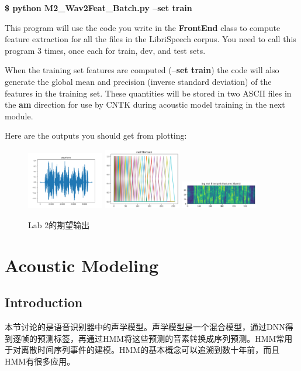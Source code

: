 {\bf \$ python M2\_Wav2Feat\_Batch.py –set train}

This program will use the code you write in the {\bf FrontEnd} class to compute feature extraction for all the files in the LibriSpeech corpus. You need to call this program 3 times, once each for train, dev, and test sets.

When the training set features are computed ({\bf –set train}) the code will also generate the global mean and precision (inverse standard deviation) of the features in the training set. These quantities will be stored in two ASCII files in the {\bf am} direction for use by CNTK during acoustic model training in the next module.

Here are the outputs you should get from plotting:
\begin{figure}[!ht]
	\centering
	\includegraphics[width=0.30\textwidth]{figure/lab2-1}
	\hspace{0.5cm}
	\includegraphics[width=0.30\textwidth]{figure/lab2-2}
	\hspace{0.5cm}
	\includegraphics[width=0.30\textwidth]{figure/lab2-3}
	\caption{Lab 2的期望输出}
\label{fig:expect-output}
\end{figure}

\section{Acoustic Modeling}
\subsection{Introduction} 
本节讨论的是语音识别器中的声学模型。声学模型是一个混合模型，通过DNN得到逐帧的预测标签，再通过HMM将这些预测的音素转换成序列预测。HMM常用于对离散时间序列事件的建模。HMM的基本概念可以追溯到数十年前，而且HMM有很多应用。

